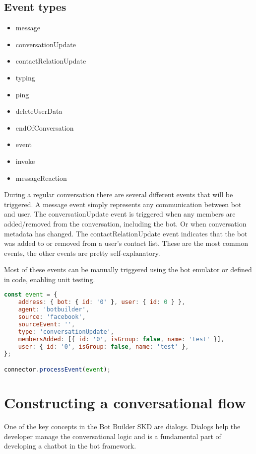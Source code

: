 \newpage

\subsection{Event types}
\begin{itemize}
	\item message
	\item conversationUpdate
	\item contactRelationUpdate
	\item typing
	\item ping
	\item deleteUserData
	\item endOfConversation
	\item event
	\item invoke
	\item messageReaction
\end{itemize}

During a regular conversation there are several different events that will be triggered. A message event simply represents any communication between bot and user. The conversationUpdate event is triggered when any members are added/removed from the conversation, including the bot. Or when conversation metadata has changed. The contactRelationUpdate event indicates that the bot was added to or removed from a user's contact list.
These are the most common events, the other events are pretty self-explanatory.

Most of these events can be manually triggered using the bot emulator or defined in code, enabling unit testing.

\begin{lstlisting}[language=JavaScript,caption=Sending a mock event to the bot,label=listing:botframework-mock-event]
const event = {
	address: { bot: { id: '0' }, user: { id: 0 } },
	agent: 'botbuilder',
	source: 'facebook',
	sourceEvent: '',
	type: 'conversationUpdate',
	membersAdded: [{ id: '0', isGroup: false, name: 'test' }],
	user: { id: '0', isGroup: false, name: 'test' },
};

connector.processEvent(event);
\end{lstlisting}

\section{Constructing a conversational flow}

One of the key concepts in the Bot Builder SKD are dialogs. Dialogs help the developer manage the conversational logic and is a fundamental part of developing a chatbot in the bot framework.


